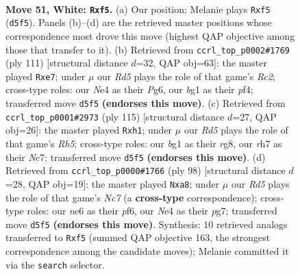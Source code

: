 \documentclass[11pt]{article}
\begin{document}
\clearpage

\begin{figure}[p]\centering
\begin{subfigure}{0.46\textwidth}\centering
\resizebox{\linewidth}{!}{%
\newchessgame
\chessboard[
  setfen={4k3/7r/4n3/3R1rPp/P3N3/8/6P1/4K1b1 w - - 0 51},
  showmover=false,
  pgfstyle=straightmove, color=movearrow, markmove={d5-f5}
]}
\caption{}
\end{subfigure}\hfill
\begin{subfigure}{0.46\textwidth}\centering
\resizebox{\linewidth}{!}{%
\newchessgame
\chessboard[
  setfen={8/2r1Rp2/5Npk/8/4pP2/1p6/1P4K1/8 b - - 0 56},
  showmover=false,
  pgfstyle=straightmove, color=movearrow, markmove={c7-e7}
]}
\caption{}
\end{subfigure}
\\[4pt]
\begin{subfigure}{0.46\textwidth}\centering
\resizebox{\linewidth}{!}{%
\newchessgame
\chessboard[
  setfen={6R1/P1n1kp2/8/6p1/7r/1P6/K7/7R b - - 0 58},
  showmover=false,
  pgfstyle=straightmove, color=movearrow, markmove={h4-h1}
]}
\caption{}
\end{subfigure}\hfill
\begin{subfigure}{0.46\textwidth}\centering
\resizebox{\linewidth}{!}{%
\newchessgame
\chessboard[
  setfen={r7/2N3pp/3k1p2/5R2/8/1K3P2/6rP/8 w - - 0 50},
  showmover=false,
  pgfstyle=straightmove, color=movearrow, markmove={c7-a8}
]}
\caption{}
\end{subfigure}
\caption{\textbf{Move 51, White: \texttt{Rxf5}.} (a) Our position; Melanie plays \texttt{Rxf5} (\texttt{d5f5}). Panels (b)--(d) are the retrieved master positions whose correspondence most drove this move (highest QAP objective among those that transfer to it). (b) Retrieved from \texttt{ccrl\_top\_p0002\#1769} (ply 111) [structural distance $d$=32, QAP obj=63]: the master played \texttt{Rxe7}; under $\mu$ our \emph{Rd5} plays the role of that game's \emph{Rc2}; cross-type roles: our \emph{N}e4 as their \emph{P}g6, our \emph{b}g1 as their \emph{p}f4; transferred move \texttt{d5f5} \textbf{(endorses this move)}. (c) Retrieved from \texttt{ccrl\_top\_p0001\#2973} (ply 115) [structural distance $d$=27, QAP obj=26]: the master played \texttt{Rxh1}; under $\mu$ our \emph{Rd5} plays the role of that game's \emph{Rh5}; cross-type roles: our \emph{b}g1 as their \emph{r}g8, our \emph{r}h7 as their \emph{N}c7; transferred move \texttt{d5f5} \textbf{(endorses this move)}. (d) Retrieved from \texttt{ccrl\_top\_p0000\#1766} (ply 98) [structural distance $d$=28, QAP obj=19]: the master played \texttt{Nxa8}; under $\mu$ our \emph{Rd5} plays the role of that game's \emph{Nc7} (a \textbf{cross-type} correspondence); cross-type roles: our \emph{n}e6 as their \emph{p}f6, our \emph{N}e4 as their \emph{p}g7; transferred move \texttt{d5f5} \textbf{(endorses this move)}. Synthesis: 10 retrieved analogs transferred to \texttt{Rxf5} (summed QAP objective 163, the strongest correspondence among the candidate moves); Melanie committed it via the \texttt{search} selector.}
\label{fig:thought-m100}
\end{figure}
\end{document}
